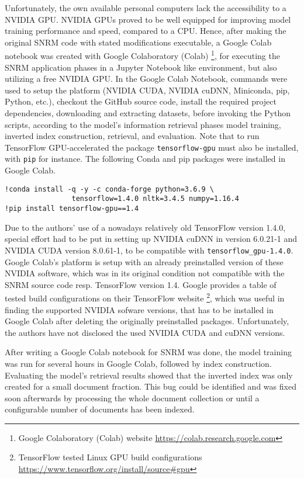 Unfortunately, the own available personal computers lack the accessibility to a NVIDIA GPU.
NVIDIA GPUs proved to be well equipped for improving model training performance and speed, compared to a CPU.
Hence, after making the original SNRM code with stated modifications executable, a Google Colab notebook was created
    with Google Colaboratory (Colab) \footnote{Google Colaboratory (Colab) website \url{https://colab.research.google.com}},
    for executing the SNRM application phases in a Jupyter Notebook like environment, 
    but also utilizing a free NVIDIA GPU.
In the Google Colab Notebook, commands were used to setup the platform (NVIDIA CUDA, NVIDIA cuDNN, Miniconda, pip, Python, etc.),
    checkout the GitHub source code,
    install the required project dependencies, downloading and extracting datasets,
    before invoking the Python scripts, according to the model's information retrieval phases
    model training, inverted index construction, retrieval, and evaluation.
Note that to run TensorFlow GPU-accelerated the package \verb|tensorflow-gpu| must also be installed,
    with \verb|pip| for instance.
The following Conda and pip packages were installed in Google Colab.
\begin{verbatim}
!conda install -q -y -c conda-forge python=3.6.9 \
                tensorflow=1.4.0 nltk=3.4.5 numpy=1.16.4
!pip install tensorflow-gpu==1.4
\end{verbatim}

Due to the authors' use of a nowadays relatively old TensorFlow version 1.4.0, special effort had to be put in setting up
    NVIDIA cuDNN in version 6.0.21-1 and NVIDIA CUDA version 8.0.61-1, to be compatible with \verb|tensorflow_gpu-1.4.0|.
Google Colab's platform is setup with an already preinstalled version of these NVIDIA software, which was in its original condition
    not compatible with the SNRM source code resp. TensorFlow version 1.4.
Google provides a table of tested build configurations on their TensorFlow website
    \footnote{TensorFlow tested Linux GPU build configurations \url{https://www.tensorflow.org/install/source\#gpu}}, 
    which was useful in finding the supported NVIDIA sofware versions, that has to be installed in Google Colab 
    after deleting the originally preinstalled packages.
Unfortunately, the authors have not disclosed the used NVIDIA CUDA and cuDNN versions.

After writing a Google Colab notebook for SNRM was done, the model training was run for several hours in Google Colab,
    followed by index construction.
Evaluating the model's retrieval results showed that the inverted index was only created for a small document fraction.
This bug could be identified and was fixed soon afterwards by processing the whole document collection or until a
    configurable number of documents has been indexed.

